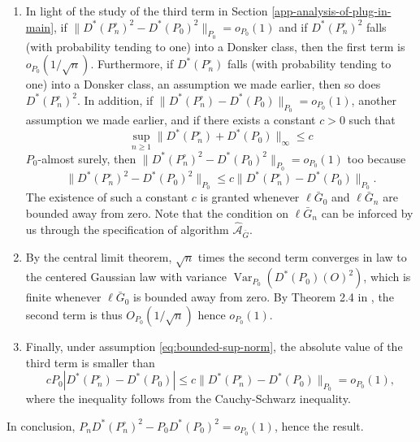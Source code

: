 \documentclass[
  11pt,
  openright,twoside]{book}
\DeclareMathOperator{\Var}{Var}
\newcommand{\Algo}{\widehat{\mathcal{A}}}
\newcommand{\Gbar}{\bar{G}}
\newcommand{\Phat}{P^{\circ}}
\theoremstyle{definition}
\theoremstyle{definition}
\theoremstyle{definition}
\theoremstyle{definition}
\theoremstyle{remark}
\begin{document}
\begin{enumerate}
\def\labelenumi{\arabic{enumi}.}
\item
  In light of the study of the third term in Section
  \ref{app-analysis-of-plug-in-main}, if \(\|D^*(\Phat_n)^2 - D^*(P_0)^2\|_{P_{0}} = o_{P_0} (1)\) and if \(D^*(\Phat_n)^{2}\) falls (with
  probability tending to one) into a Donsker class, then the first term is
  \(o_{P_0}(1/\sqrt{n})\). Furthermore, if \(D^*(\Phat_n)\) falls (with
  probability tending to one) into a Donsker class, an assumption we made
  earlier, then so does \(D^*(\Phat_n)^{2}\). In addition, if
  \(\|D^*(\Phat_n) - D^*(P_0)\|_{P_{0}} = o_{P_0} (1)\), another assumption we
  made earlier, and if there exists a constant \(c>0\) such that
  \begin{equation} \sup_{n \geq 1}  \|D^*(\Phat_n) + D^*(P_0)\|_{\infty} \leq
  c \label{eq:bounded-sup-norm}  \end{equation} \(P_{0}\)-almost surely, then \(\|D^*(\Phat_n)^2 - D^*(P_0)^2\|_{P_{0}} = o_{P_0} (1)\) too because \begin{equation}
  \|D^*(\Phat_n)^2   -   D^*(P_0)^2\|_{P_{0}}   \leq   c   \|D^*(\Phat_n)   -
  D^*(P_0)\|_{P_{0}}.  \end{equation} The existence of such a constant \(c\) is
  granted whenever \(\ell\Gbar_{0}\) and \(\ell\Gbar_{n}\) are bounded away from
  zero. Note that the condition on \(\ell\Gbar_{n}\) can be inforced by us
  through the specification of algorithm \(\Algo_{\Gbar}\).
\item
  By the central limit theorem, \(\sqrt{n}\) times the second term converges in
  law to the centered Gaussian law with variance \(\Var_{P_{0}} (D^{*} (P_{0})(O)^2)\), which is finite whenever \(\ell\Gbar_{0}\) is bounded away
  from zero. By Theorem 2.4 in \citep{vdV98}, the second term is thus \(O_{P_0} (1/\sqrt{n})\) hence \(o_{P_0} (1)\).
\item
  Finally, under assumption \eqref{eq:bounded-sup-norm}, the absolute value of
  the third term is smaller than \begin{equation}c  P_{0} |D^*(\Phat_n)  -
  D^*(P_0)|     \leq    c     \|D^*(\Phat_n)    -     D^*(P_0)\|_{P_{0}}    =
  o_{P_0}(1),\end{equation} where the inequality follows from the
  Cauchy-Schwarz inequality.
\end{enumerate}

In conclusion, \(P_{n} D^{*} (\Phat_n)^2 - P_{0} D^{*} (P_{0})^2 = o_{P_0}(1)\),
hence the result.
\end{document}
